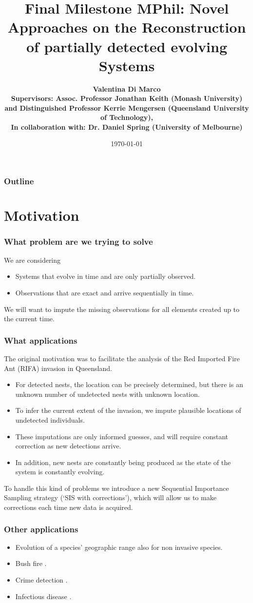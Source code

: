 \documentclass[9pt, xcolor={dvipsnames,svgnames,table}]{beamer}
\title{Final Milestone MPhil: Novel Approaches on the Reconstruction of partially detected evolving Systems}
\author[Valentina Di Marco]{\textbf {Valentina Di Marco\\ \footnotesize Supervisors: Assoc. Professor Jonathan Keith (Monash University) and Distinguished Professor Kerrie Mengersen (Queensland University of Technology), \\ \footnotesize In collaboration with: Dr. Daniel Spring (University of Melbourne)}}
\date{\today}
\begin{document}
\begin{frame}
    \titlepage
\end{frame}

\begin{frame}
    \frametitle{Outline}
    \tableofcontents
\end{frame}



\section{Motivation}

\begin{frame}
\frametitle{What problem are we trying to solve}
We are considering
\begin{itemize}
\setlength\itemsep{1em}
    \item Systems that evolve in time and are only partially observed.
    \item Observations that are exact and arrive sequentially in time.
\end{itemize}
We will want to impute the missing observations for all elements created up to the current time.
\end{frame}


\begin{frame}
    \frametitle{What applications}
    The original motivation was to facilitate the analysis of the Red Imported Fire Ant (RIFA) invasion in Queensland.
    \begin{itemize}
        \item For detected nests, the location can be precisely determined, but there is an unknown number of undetected nests with unknown location. 
        \item To infer the current extent of the invasion, we impute plausible locations of undetected individuals. 
        \item These imputations are only informed guesses, and will require constant correction as new detections arrive. 
        \item In addition, new nests are constantly being produced as the state of the system is constantly evolving.
    \end{itemize}
    To handle this kind of problems we introduce a new Sequential Importance Sampling  strategy (`SIS with corrections'), which will allow us to make corrections each time new data is acquired.
\end{frame}


\begin{frame}
    \frametitle{Other applications}
    \begin{itemize}
    \setlength\itemsep{1em}
        \item Evolution of a species’ geographic range also for non invasive species.
        \item Bush fire \cite{}.
        \item Crime detection \cite{}.
        \item Infectious disease \cite{}.
    \end{itemize}
\end{frame}
\end{document}
